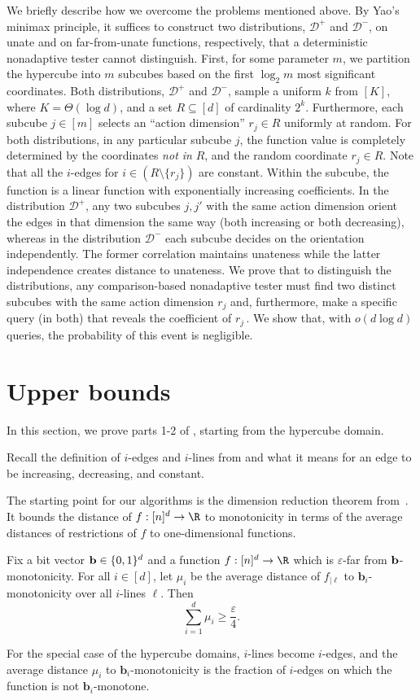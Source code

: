 \documentclass{toc}
\newcommand{\eps}{\varepsilon}
\newcommand{\bb}{\ensuremath{\mathbf{b}}}
\newcommand{\totcube}{\ensuremath{m}}
\newcommand{\Yes}{\ensuremath{\mathcal{D}^+}}
\newcommand{\No}{\ensuremath{\mathcal{D}^-}}
\newcommand{\Sec}[1]{\expref{Section}{sec:#1}}
\newcommand{\Thm}[1]{\expref{Theorem}{thm:#1}}
\begin{document}
We briefly describe how we overcome the problems mentioned above.
By Yao's minimax principle, it suffices to construct two distributions,
%
$\Yes$ and $\No$, on unate and
%
on  %
far-from-unate functions,   %
%
respectively, %
that a deterministic nonadaptive tester cannot distinguish.
First, for some parameter $m$, we partition the hypercube
into $\totcube$ subcubes based 
%
%
on 
%
the first $\log_2\totcube$ most significant coordinates.
Both distributions, $\Yes$ and $\No$, sample a uniform $k$ from $[K]$, where $K=\Theta(\log d)$, and a set $R\subseteq[d]$ of cardinality $2^k$.
Furthermore, each subcube $j\in [\totcube]$ selects an ``action dimension'' $r_j\in R$ uniformly at random. For both distributions, in any particular subcube $j$, the function value is completely determined by the coordinates \emph{not in} $R$, and the random coordinate $r_j\in R$. Note that all the $i$-edges for $i\in (R\setminus \{r_j\})$ are constant.
Within the subcube, the function is a linear function
with exponentially increasing coefficients.
In the distribution $\Yes$, any two subcubes $j,j'$ with the same action dimension orient the edges in that dimension the same  way (both increasing or both decreasing), whereas in the distribution $\No$ each subcube decides on the orientation independently.
The former correlation maintains unateness while the 
latter independence creates distance to unateness.
We prove that to distinguish the distributions,
any comparison-based nonadaptive tester must find two distinct subcubes
with the same action dimension $r_j$ and, furthermore, make a specific
%
query (in both) that reveals the coefficient of $r_j$\,.
%
We show that, with $o(d\log d)$ queries, the probability of this event is negligible.

\section{Upper bounds}\label{sec:upper-bounds}
In this section, we prove parts 1-2 of \Thm{main-hg}, starting from the hypercube domain.

Recall the definition of $i$-edges and $i$-lines from \Sec{intro-tech} and what it means for an edge to be increasing, decreasing, and constant.

The starting point for our algorithms is the dimension reduction theorem from~\cite{CDJS17}. It bounds the distance of $f:[n]^d \to \R$ to monotonicity in terms of
the %
average distances of restrictions of $f$ to one-dimensional functions.
%
\begin{theorem} \label{thm:dimred} Fix a bit vector ${\bf b}\in\{0,1\}^d$ and a function $f:[n]^d \to \R$ which is $\eps$-far from ${\bf b}$-monotonicity.
	For all $i\in[d]$, let $\mu_i$ be the average distance of $f_{|\ell}$ to $\bb_i$-monotonicity over all $i$-lines $\ell$.
	Then \[\sum_{i=1}^d \mu_i \geq \frac{\eps}{4}.\]
\end{theorem}
For the special case of the hypercube domains, $i$-lines become $i$-edges, and the average distance $\mu_i$ to $\bb_i$-monotonicity is the fraction of $i$-edges on which the function is not $\bb_i$-monotone.
\end{document}
